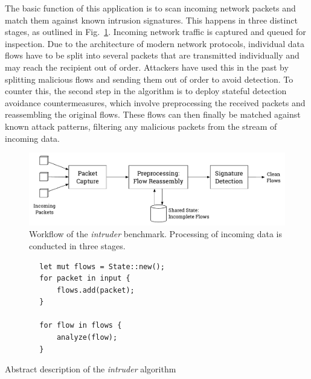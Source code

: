 The basic function of this application is to scan incoming network packets and match them against known intrusion signatures.
This happens in three distinct stages, as outlined in Fig.~\ref{fig:experiments:intruder:workflow}.
Incoming network traffic is captured and queued for inspection.
Due to the architecture of modern network protocols, individual data flows have to be split into several packets that are transmitted individually and may reach the recipient out of order.
Attackers have used this in the past by splitting malicious flows and sending them out of order to avoid detection.
To counter this, the second step in the algorithm is to deploy stateful detection avoidance countermeasures, which involve preprocessing the received packets and reassembling the original flows.
These flows can then finally be matched against known attack patterns, filtering any malicious packets from the stream of incoming data.

\begin{figure}
    \includegraphics[width=\textwidth,keepaspectratio]{gfx/experiments-intruder}
    \caption{Workflow of the \emph{intruder} benchmark. Processing of incoming data is conducted in three stages.}%
    \label{fig:experiments:intruder:workflow}
\end{figure}

\begin{listing}
    \begin{verbatim}
        let mut flows = State::new();
        for packet in input {
            flows.add(packet);
        }

        for flow in flows {
            analyze(flow);
        }
    \end{verbatim}
    \caption{Abstract description of the \emph{intruder} algorithm}
    \label{fig:experiments:opportunities:algos:intruder}
\end{listing}

